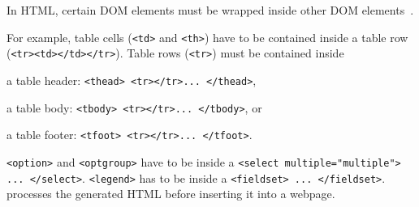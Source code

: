In HTML, certain DOM elements must be wrapped inside other DOM elements~\cite{jsninja}.  

For example, table cells ({\tt <td>} and {\tt <th>}) have to be contained inside a table row ({\tt <tr><td></td></tr>}).
Table rows ({\tt <tr>}) must be contained inside 
\begin{compactitem}
\item a table header: {\tt <thead> <tr></tr>... </thead>}, 
\item a table body: {\tt <tbody> <tr></tr>... </tbody>}, or
\item a table footer: {\tt <tfoot> <tr></tr>... </tfoot>}.
\end{compactitem}

{\tt <option>} and {\tt <optgroup>} have to be inside a {\tt <select multiple="multiple"> ... </select>}.
{\tt <legend>} has to be inside a {\tt <fieldset> ... </fieldset>}.
\tool processes the generated HTML before inserting it into a webpage.  
